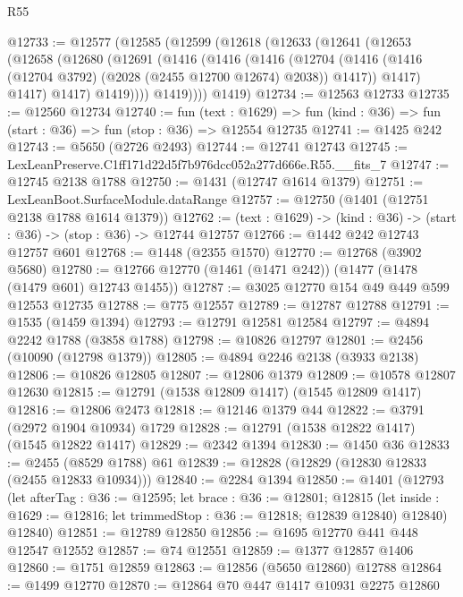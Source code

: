 \begin{lexlean}{R55}
\begin{coremodule}
{{@12733 := @12577
    (@12585
      (@12599
        (@12618
          (@12633
            (@12641
              (@12653
                (@12658
                  (@12680
                    (@12691
                      (@1416
                        (@1416
                          (@1416
                            (@12704
                              (@1416
                                (@1416 (@12704 @3792) (@2028 (@2455 @12700 @12674) @2038))
                                @1417))
                            @1417)
                          @1417)
                        @1417)
                      @1419))))
              @1419))))
      @1419)
@12734 := @12563 @12733
@12735 := @12560 @12734
@12740 := fun (text : @1629) =>
  fun (kind : @36) => fun (start : @36) => fun (stop : @36) => @12554 @12735
@12741 := @1425 @242
@12743 := @5650 (@2726 @2493)
@12744 := @12741 @12743
@12745 := LexLeanPreserve.C1ff171d22d5f7b976dcc052a277d666e.R55.__fits_7
@12747 := @12745 @2138 @1788
@12750 := @1431 (@12747 @1614 @1379)
@12751 := LexLeanBoot.SurfaceModule.dataRange
@12757 := @12750 (@1401 (@12751 @2138 @1788 @1614 @1379))
@12762 := (text : @1629) -> (kind : @36) -> (start : @36) -> (stop : @36) -> @12744 @12757
@12766 := @1442 @242 @12743 @12757 @601
@12768 := @1448 (@2355 @1570)
@12770 := @12768 (@3902 @5680)
@12780 := @12766 @12770 (@1461 (@1471 @242)) (@1477 (@1478 (@1479 @601) @12743 @1455))
@12787 := @3025 @12770 @154 @49 @449 @599 @12553 @12735
@12788 := @775 @12557
@12789 := @12787 @12788
@12791 := @1535 (@1459 @1394)
@12793 := @12791 @12581 @12584
@12797 := @4894 @2242 @1788 (@3858 @1788)
@12798 := @10826 @12797
@12801 := @2456 (@10090 (@12798 @1379))
@12805 := @4894 @2246 @2138 (@3933 @2138)
@12806 := @10826 @12805
@12807 := @12806 @1379
@12809 := @10578 @12807 @12630
@12815 := @12791 (@1538 @12809 @1417) (@1545 @12809 @1417)
@12816 := @12806 @2473
@12818 := @12146 @1379 @44
@12822 := @3791 (@2972 @1904 @10934) @1729
@12828 := @12791 (@1538 @12822 @1417) (@1545 @12822 @1417)
@12829 := @2342 @1394
@12830 := @1450 @36
@12833 := @2455 (@8529 @1788) @61
@12839 := @12828 (@12829 (@12830 @12833 (@2455 @12833 @10934)))
@12840 := @2284 @1394
@12850 := @1401
    (@12793
      (let afterTag : @36 := @12595;
      let brace : @36 := @12801;
      @12815 (let inside : @1629 := @12816; let trimmedStop : @36 := @12818; @12839 @12840) @12840)
      @12840)
@12851 := @12789 @12850
@12856 := @1695 @12770 @441 @448 @12547 @12552
@12857 := @74 @12551
@12859 := @1377 @12857 @1406
@12860 := @1751 @12859
@12863 := @12856 (@5650 @12860) @12788
@12864 := @1499 @12770
@12870 := @12864 @70 @447 @1417 @10931 @2275 @12860
}}
\end{coremodule}
\end{lexlean}
